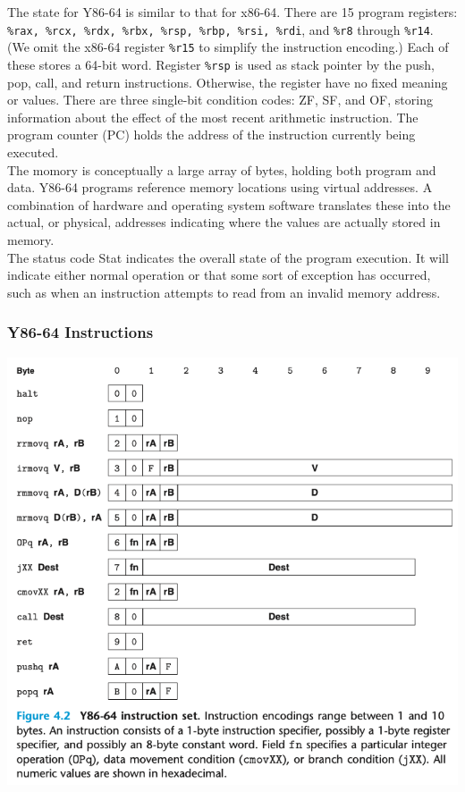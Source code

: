 \documentclass[11pt]{article}
\begin{document}
The state for Y86-64 is similar to that for x86-64. There are 15 program registers: \texttt{\%rax, \%rcx, \%rdx, \%rbx, \%rsp, \%rbp, \%rsi, \%rdi}, and \texttt{\%r8} through \texttt{\%r14}. (We omit the x86-64 register \texttt{\%r15} to simplify the instruction encoding.)  Each of these stores a 64-bit word. Register \texttt{\%rsp} is used as stack pointer by the push, pop, call, and return instructions. Otherwise, the register have no fixed meaning or values. There are three single-bit condition codes: ZF, SF, and OF, storing information about the effect of the most recent arithmetic instruction. The program counter (PC) holds the address of the instruction currently being executed.\\

The momory is conceptually a large array of bytes, holding both program and data. Y86-64 programs reference memory locations using virtual addresses. A combination of hardware and operating system software translates these into the actual, or physical, addresses indicating where the values are actually stored in memory.\\

The status code Stat indicates the overall state of the program execution. It will indicate either normal operation or that some sort of exception has occurred, such as when an instruction attempts to read from an invalid memory address.\\

\subsubsection{Y86-64 Instructions}
\label{sec:orgce827d8}

\begin{center}
\includegraphics[width=.9\linewidth]{pics/y86-64-instruction-set.png}
\end{center}
\end{document}
